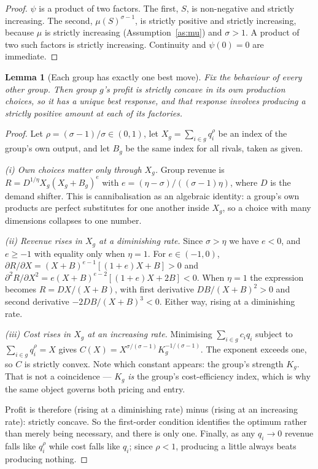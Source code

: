 \documentclass[11pt]{article}
\theoremstyle{plain}
\newtheorem{lemma}{Lemma}
\theoremstyle{remark}
\theoremstyle{definition}
\begin{document}
\begin{proof}
$\psi$ is a product of two factors. The first, $S$, is non-negative and strictly
increasing. The second, $\mu(S)^{\sigma-1}$, is strictly positive and strictly
increasing, because $\mu$ is strictly increasing (Assumption~\ref{as:mu}) and
$\sigma>1$. A product of two such factors is strictly increasing. Continuity and
$\psi(0)=0$ are immediate.
\end{proof}

\begin{lemma}[Each group has exactly one best move]\label{lem:br}
Fix the behaviour of every other group. Then group $g$'s profit is strictly concave in
its own production choices, so it has a unique best response, and that response
involves producing a strictly positive amount at each of its factories.
\end{lemma}

\begin{proof}
Let $\rho=(\sigma-1)/\sigma\in(0,1)$, let $X_g=\sum_{i\in g}q_i^{\rho}$ be an index of
the group's own output, and let $B_g$ be the same index for all rivals, taken as given.

\emph{(i) Own choices matter only through $X_g$.} Group revenue is
$R=D^{1/\eta}X_g(X_g+B_g)^{e}$ with $e=(\eta-\sigma)/((\sigma-1)\eta)$, where $D$ is
the demand shifter. This is cannibalisation as an algebraic identity: a group's own
products are perfect substitutes for one another inside $X_g$, so a choice with many
dimensions collapses to one number.

\emph{(ii) Revenue rises in $X_g$ at a diminishing rate.} Since $\sigma>\eta$ we have
$e<0$, and $e\ge-1$ with equality only when $\eta=1$. For $e\in(-1,0)$,
$\partial R/\partial X=(X+B)^{e-1}[(1+e)X+B]>0$ and
$\partial^2R/\partial X^2=e(X+B)^{e-2}[(1+e)X+2B]<0$. When $\eta=1$ the expression
becomes $R=DX/(X+B)$, with first derivative $DB/(X+B)^2>0$ and second derivative
$-2DB/(X+B)^3<0$. Either way, rising at a diminishing rate.

\emph{(iii) Cost rises in $X_g$ at an increasing rate.} Minimising
$\sum_{i\in g}c_iq_i$ subject to $\sum_{i\in g}q_i^{\rho}=X$ gives
$C(X)=X^{\sigma/(\sigma-1)}K_g^{-1/(\sigma-1)}$. The exponent exceeds one, so $C$ is
strictly convex. Note which constant appears: the group's strength $K_g$. That is not
a coincidence --- $K_g$ \emph{is} the group's cost-efficiency index, which is why the
same object governs both pricing and entry.

Profit is therefore (rising at a diminishing rate) minus (rising at an increasing
rate): strictly concave. So the first-order condition identifies the optimum rather
than merely being necessary, and there is only one. Finally, as any $q_i\to0$ revenue
falls like $q_i^{\rho}$ while cost falls like $q_i$; since $\rho<1$, producing a
little always beats producing nothing.
\end{proof}
\end{document}

